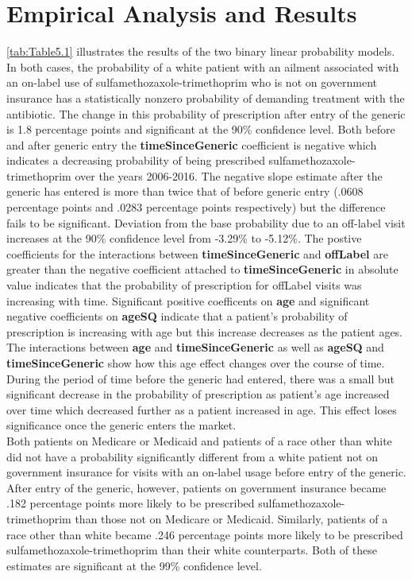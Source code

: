 \chapter{Empirical Analysis and Results}
\indent \autoref{tab:Table5.1} illustrates the results of the two binary linear probability models. In both cases, the probability of a white patient with an ailment associated with an on-label use of sulfamethozaxole-trimethoprim who is not on government insurance has a statistically nonzero probability of demanding treatment with the antibiotic. The change in this probability of prescription after entry of the generic is 1.8 percentage points and significant at the 90\% confidence level. Both before and after generic entry the \textbf{timeSinceGeneric} coefficient is negative which indicates a decreasing probability of being prescribed sulfamethozaxole-trimethoprim over the years 2006-2016. The negative slope estimate after the generic has entered is more than twice that of before generic entry (.0608 percentage points and .0283 percentage points respectively) but the difference fails to be significant. Deviation from the base probability due to an off-label visit increases at the 90\% confidence level from -3.29\% to -5.12\%. The postive coefficients for the interactions between \textbf{timeSinceGeneric} and \textbf{offLabel} are greater than the negative coefficient attached to \textbf{timeSinceGeneric} in absolute value indicates that the probability of prescription for offLabel visits was increasing with time. Significant positive coefficents on \textbf{age} and significant negative coefficients on \textbf{ageSQ} indicate that a patient's probability of prescription is increasing with age but this increase decreases as the patient ages. The interactions between \textbf{age} and \textbf{timeSinceGeneric} as well as \textbf{ageSQ} and \textbf{timeSinceGeneric} show how this age effect changes over the course of time. During the period of time before the generic had entered, there was a small but significant decrease in the probability of prescription as patient's age increased over time which decreased further as a patient increased in age. This effect loses significance once the generic enters the market.\\
\indent Both patients on Medicare or Medicaid and patients of a race other than white did not have a probability significantly different from a white patient not on government insurance for visits with an on-label usage before entry of the generic. After entry of the generic, however, patients on government insurance became .182 percentage points more likely to be prescribed sulfamethozaxole-trimethoprim than those not on Medicare or Medicaid. Similarly, patients of a race other than white became .246 percentage points more likely to be prescribed sulfamethozaxole-trimethoprim than their white counterparts. Both of these estimates are significant at the 99\% confidence level. 
